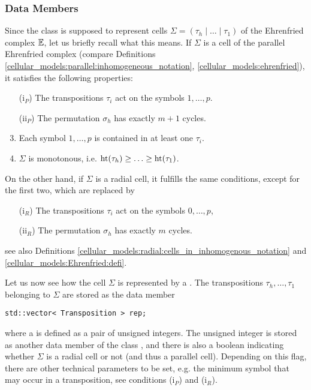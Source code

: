 \subsubsection{Data Members}
\label{program:kappa:tuple:members}
Since the class  is supposed to represent cells $\Sigma = (\tau_h \mid \ldots \mid \tau_1)$ of the Ehrenfried complex $\mathbb E$, 
let us briefly recall what this means. 
If $\Sigma$ is a cell of the parallel Ehrenfried complex 
(compare Definitions \ref{cellular_models:parallel:inhomogeneous_notation}, \ref{cellular_models:ehrenfried}), 
it satisfies the following properties:
\begin{enumerate}
 \item[(i$_P$)] The transpositions $\tau_i$ act on the symbols $1, \dotsc, p$.
 \item[(ii$_P$)] The permutation $\sigma_h$ has exactly $m+1$ cycles.
 \setcounter{enumi}{2}
 \item Each symbol $1, \dotsc, p$ is contained in at least one $\tau_i$.
 \item $\Sigma$ is monotonous, i.e. $\operatorname{ht}(\tau_h) \geq \dotsc \geq \operatorname{ht}(\tau_1)$.
\end{enumerate}
On the other hand, if $\Sigma$ is a radial cell, it fulfills the same conditions, 
except for the first two, which are replaced by
\begin{enumerate}
 \item[(i$_R$)] The transpositions $\tau_i$ act on the symbols $0, \dotsc, p$,
 \item[(ii$_R$)] The permutation $\sigma_h$ has exactly $m$ cycles.
\end{enumerate}
see also Definitions \ref{cellular_models:radial:cells_in_inhomogenous_notation} and \ref{cellular_models:Ehrenfried:defi}.

Let us now see how the cell $\Sigma$ is represented by a .
The transpositions $\tau_h, \dotsc, \tau_1$ belonging to $\Sigma$ are stored as the data member
\begin{lstlisting}
std::vector< Transposition > rep;
\end{lstlisting}
where a  is defined as a pair of unsigned integers.
The unsigned integer  is stored as another data member of the class ,
and there is also a boolean  indicating whether $\Sigma$ is a radial cell or not (and thus a parallel cell).
Depending on this flag, there are other technical parameters to be set, 
e.g. the minimum symbol that may occur in a transposition, see conditions (i$_P$) and (i$_R$).

